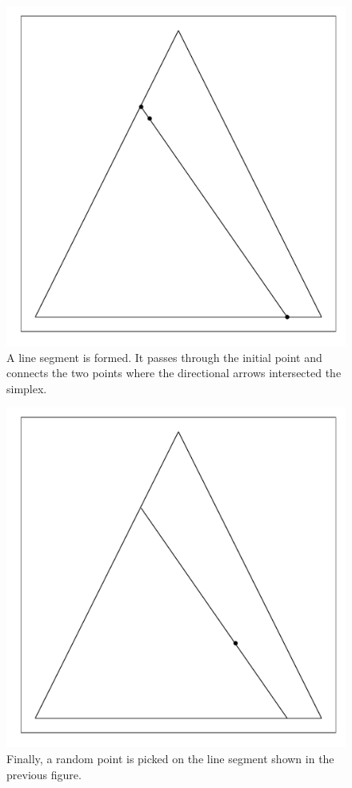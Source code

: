 \documentclass{article}\usepackage{graphicx, color}
\makeatletter
\def\maxwidth{ %
  \ifdim\Gin@nat@width>\linewidth
    \linewidth
  \else
    \Gin@nat@width
  \fi
}
\newenvironment{knitrout}{}{} %
\makeatother
\begin{document}
\begin{figure}[H]
\begin{knitrout}
\color{fgcolor}
\includegraphics[width=\maxwidth]{figure/hitandrun_walkthrough5} 

\end{knitrout}

\caption{A line segment is formed. It passes through the initial point and connects the two points where the directional arrows intersected the simplex.}
\end{figure}

\begin{figure}[H]
\begin{knitrout}
\color{fgcolor}
\includegraphics[width=\maxwidth]{figure/hitandrun_walkthrough6} 

\end{knitrout}

\caption{Finally, a random point is picked on the line segment shown in the previous figure.}
\end{figure}
\end{document}
